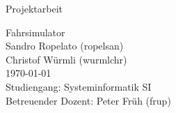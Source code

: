 %
%

\begin{titlepage}

\cleardoublepage

\vspace{4em}
\center

\Large{\textsf{Projektarbeit}}
\vspace{1em}

\Huge{\textsf{Fahrsimulator}}
\vspace{2em}
\\
\Large{
	\textsf{
		Sandro Ropelato (ropelsan)\\
		Christof Würmli (wurmlchr)\\
		\vspace{2em}
		\today\\
		\vspace{2em}
		Studiengang: Systeminformatik SI\\
		Betreuender Dozent: Peter Früh (frup)
	}
}

\end{titlepage}
